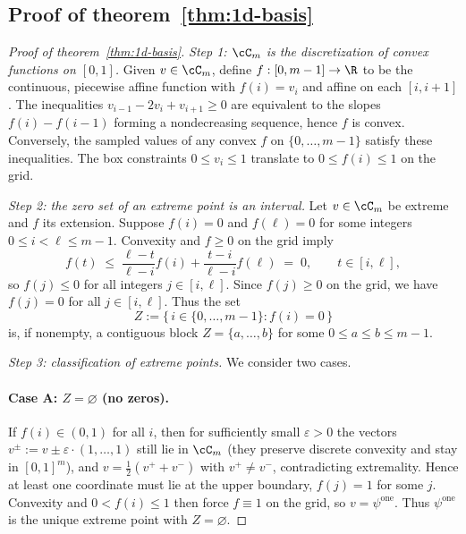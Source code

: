 \subsection{Proof of theorem~\ref{thm:1d-basis}}
\label{proof:thm:1d-basis}
\begin{proof}[Proof of theorem~\ref{thm:1d-basis}]
    \emph{Step 1: $\cC_m$ is the discretization of convex functions on $[0,1]$.}
    Given $v\in\cC_m$, define $f:[0,m-1]\to\R$ to be the continuous, piecewise
    affine function with $f(i)=v_i$ and affine on each $[i,i+1]$.
    The inequalities $v_{i-1}-2v_i+v_{i+1}\ge 0$ are equivalent to the slopes
    $f(i)-f(i-1)$ forming a nondecreasing sequence, hence $f$ is convex.
    Conversely, the sampled values of any convex $f$ on $\{0,\dots,m-1\}$ satisfy
    these inequalities.
    The box constraints $0\le v_i\le 1$ translate to $0\le f(i)\le 1$ on the grid.

    \smallskip
    \emph{Step 2: the zero set of an extreme point is an interval.}
    Let $v\in\cC_m$ be extreme and $f$ its extension.
    Suppose $f(i)=0$ and $f(\ell)=0$ for some integers $0\le i<\ell\le m-1$.
    Convexity and $f\ge 0$ on the grid imply
    \[
        f(t)
        \;\le\;
        \frac{\ell-t}{\ell-i}f(i)
        +
        \frac{t-i}{\ell-i}f(\ell)
        \;=\; 0,
        \qquad t\in[i,\ell],
    \]
    so $f(j)\le 0$ for all integers $j\in[i,\ell]$.
    Since $f(j)\ge 0$ on the grid, we have $f(j)=0$ for all $j\in[i,\ell]$.
    Thus the set
    \[
        Z := \{\,i\in\{0,\dots,m-1\}: f(i)=0\,\}
    \]
    is, if nonempty, a contiguous block $Z=\{a,\dots,b\}$ for some $0\le a\le b\le m-1$.

    \smallskip
    \emph{Step 3: classification of extreme points.}
    We consider two cases.

    \paragraph{Case A: \texorpdfstring{$Z=\varnothing$}{Z=empty} (no zeros).}
    If $f(i)\in(0,1)$ for all $i$, then for sufficiently small $\varepsilon>0$ the
    vectors $v^\pm:=v\pm\varepsilon\cdot(1,\dots,1)$ still lie in $\cC_m$ (they
    preserve discrete convexity and stay in $[0,1]^m$), and $v=\tfrac12(v^+ + v^-)$
    with $v^+\neq v^-$, contradicting extremality.
    Hence at least one coordinate must lie at the upper boundary, $f(j)=1$ for some $j$.
    Convexity and $0<f(i)\le 1$ then force $f\equiv 1$ on the grid, so $v=\psi^{\mathrm{one}}$.
    Thus $\psi^{\mathrm{one}}$ is the unique extreme point with $Z=\varnothing$.


\end{proof}
